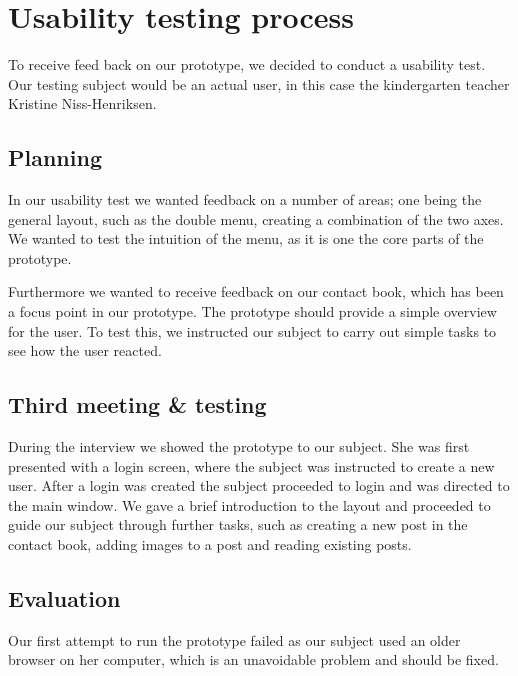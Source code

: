\section{Usability testing process}
To receive feed back on our prototype, we decided to conduct a usability test. Our testing subject would be an actual user, in this case the kindergarten teacher Kristine Niss-Henriksen.
\subsection{Planning}

In our usability test we wanted feedback on a number of areas; one being the general layout, such as the double menu, creating a combination of the two axes. We wanted to test the intuition of the menu, as it is one the core parts of the prototype. 
 
Furthermore we wanted to receive feedback on our contact book, which has been a focus point in our prototype. The prototype should provide a simple overview for the user. To test this, we instructed our subject to carry out simple tasks to see how the user reacted.


\subsection{Third meeting \& testing}

During the interview we showed the prototype to our subject. She was first presented with a login screen, where the subject was instructed to create a new user. After a login was created the subject proceeded to login and was directed to the main window. We gave a brief introduction to the layout and proceeded to guide our subject through further tasks, such as creating a new post in the contact book, adding images to a post and reading existing posts. 


\subsection{Evaluation}
Our first attempt to run the prototype failed as our subject used an older browser on her computer, which is an unavoidable problem and should be fixed.

